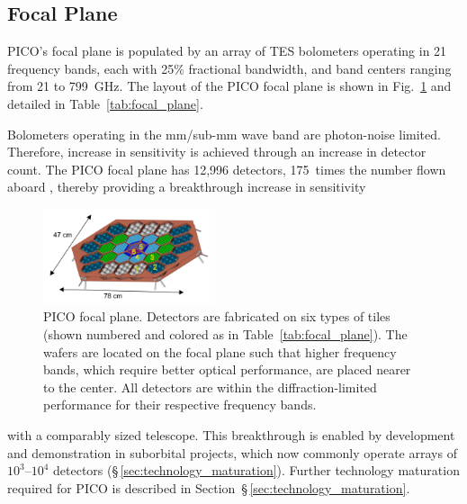 
\subsection{Focal Plane}
\label{sec:focal_plane} %
%


PICO's focal plane is populated by an array of \ac{TES} bolometers operating in 21 frequency bands, each with 25\% fractional bandwidth, and band centers ranging from 21 to 799~GHz. 
The layout of the PICO focal plane is shown in Fig.~\ref{fig:FocalPlaneMechanical} and detailed in Table~\ref{tab:focal_plane}. 

Bolometers operating in the mm/sub-mm wave band are photon-noise limited. Therefore, increase in sensitivity is achieved through an increase in detector count. The PICO focal plane has 12,996 detectors, 175~times the number flown aboard \planck , thereby providing a breakthrough increase in sensitivity
\begin{figure}
\vskip -8pt
\hfill
\includegraphics[width=0.45\textwidth]{figures/FocalPlaneMechanical.png}
\vskip -2pt
\caption{\captiontext PICO focal plane. Detectors are fabricated on six types of tiles (shown numbered and colored as in Table~\ref{tab:focal_plane}). The wafers are located on the focal plane such that higher frequency bands, which require better optical performance, are placed nearer to the center. All detectors are within the diffraction-limited performance for their respective frequency bands.  
\label{fig:FocalPlaneMechanical}}
\end{figure}
with a comparably sized telescope. This breakthrough is enabled by development and demonstration in suborbital projects, which now commonly operate arrays of $10^3$--$10^4$ detectors (\S\,\ref{sec:technology_maturation}). Further technology maturation required for PICO is described in Section~\S\,\ref{sec:technology_maturation}.

